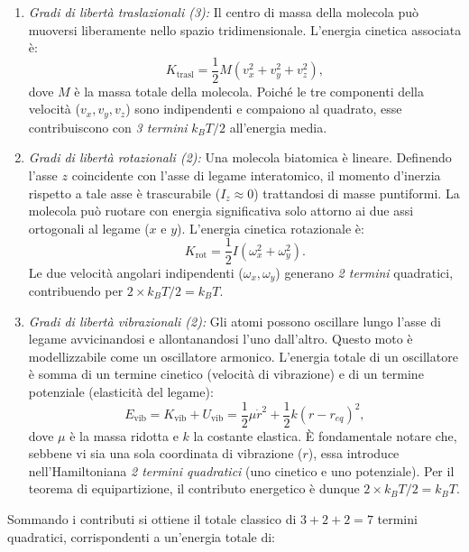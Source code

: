 \documentclass[a4paper,11pt]{report}
\begin{document}
\begin{enumerate}
    \item \textit{Gradi di libertà traslazionali (3):}
    Il centro di massa della molecola può muoversi liberamente nello spazio tridimensionale. L'energia cinetica associata è:
    \begin{equation}
        K_{\text{trasl}} = \frac{1}{2}M(v_x^2 + v_y^2 + v_z^2),
    \end{equation}
    dove $M$ è la massa totale della molecola. Poiché le tre componenti della velocità ($v_x, v_y, v_z$) sono indipendenti e compaiono al quadrato, esse contribuiscono con \textit{3 termini} $k_B T/2$ all'energia media.
    
    \item \textit{Gradi di libertà rotazionali (2):}
    Una molecola biatomica è lineare. Definendo l'asse $z$ coincidente con l'asse di legame interatomico, il momento d'inerzia rispetto a tale asse è trascurabile ($I_z \approx 0$) trattandosi di masse puntiformi. La molecola può ruotare con energia significativa solo attorno ai due assi ortogonali al legame ($x$ e $y$). L'energia cinetica rotazionale è:
    \begin{equation}
        K_{\text{rot}} = \frac{1}{2}I(\omega_x^2 + \omega_y^2).
    \end{equation}
    Le due velocità angolari indipendenti ($\omega_x, \omega_y$) generano \textit{2 termini} quadratici, contribuendo per $2 \times k_B T/2 = k_B T$.
    
    \item \textit{Gradi di libertà vibrazionali (2):}
    Gli atomi possono oscillare lungo l'asse di legame avvicinandosi e allontanandosi l'uno dall'altro. Questo moto è modellizzabile come un oscillatore armonico. L'energia totale di un oscillatore è somma di un termine cinetico (velocità di vibrazione) e di un termine potenziale (elasticità del legame):
    \begin{equation}
        E_{\text{vib}} = K_{\text{vib}} + U_{\text{vib}} = \frac{1}{2}\mu \dot{r}^2 + \frac{1}{2}k (r-r_{eq})^2,
    \end{equation}
    dove $\mu$ è la massa ridotta e $k$ la costante elastica.
    È fondamentale notare che, sebbene vi sia una sola coordinata di vibrazione ($r$), essa introduce nell'Hamiltoniana \textit{2 termini quadratici} (uno cinetico e uno potenziale). Per il teorema di equipartizione, il contributo energetico è dunque $2 \times k_B T/2 = k_B T$.
\end{enumerate}
Sommando i contributi si ottiene il totale classico di $3 + 2 + 2 = 7$ termini quadratici, corrispondenti a un'energia totale di: 
\end{document}
